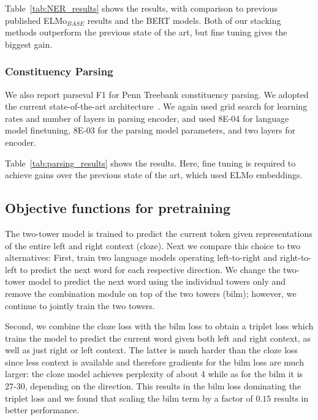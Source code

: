 \documentclass[11pt,a4paper]{article}
\begin{document}
Table~\ref{tab:NER_results} shows the results, with comparison to previous published ELMo$_{BASE}$ results \citep{peters2018acl} and the BERT models. Both of our stacking methods outperform the previous state of the art, but fine tuning gives the biggest gain. 


\subsubsection{Constituency Parsing}
\label{sec:parsing}
We also report parseval F1 for Penn Treebank constituency parsing. We adopted the current state-of-the-art architecture~\cite{kitaev2018acl}. We again used grid search for learning rates and number of layers in parsing encoder, and used 8E-04 for language model finetuning, 8E-03 for the parsing model parameters, and two layers for encoder. 

Table~\ref{tab:parsing_results} shows the results. Here, fine tuning is required to achieve gains over the previous state of the art, which used ELMo embeddings. 

\subsection{Objective functions for pretraining}
\label{sec:losses}

The two-tower model is trained to predict the current token given representations of the entire left and right context (cloze).
Next we compare this choice to two alternatives:
First, \citet{peters2018acl} train two language models operating left-to-right and right-to-left to predict the next word for each respective direction.
We change the two-tower model to predict the next word using the individual towers only and remove the combination module on top of the two towers (bilm); however, we continue to jointly train the two towers.

Second, we combine the cloze loss with the bilm loss to obtain a triplet loss which trains the model to predict the current word given both left and right context, as well as just right or left context.
The latter is much harder than the cloze loss since less context is available and therefore gradients for the bilm loss are much larger: the cloze model achieves perplexity of about 4 while as for the bilm it is 27-30, depending on the direction.
This results in the bilm loss dominating the triplet loss and we found that scaling the bilm term by a factor of $0.15$ results in better performance.
\end{document}

